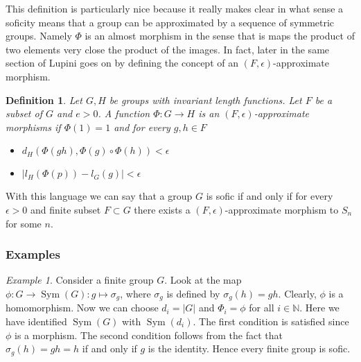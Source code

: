 \documentclass[titlepage, a4paper]{article}
\newcommand{\N}{\mathbb{N}}
\newcommand{\card}[1]{\left| #1 \right|}
\DeclareMathOperator{\sym}{Sym}
\newtheorem{definition}[theorem]{Definition}
\theoremstyle{remark}
\newtheorem{example}[theorem]{Example}
\begin{document}
	This definition is particularly nice because it really makes clear in what sense a soficity means that a group can be approximated by a sequence of symmetric groups. 
	Namely $\Phi$ is an almost morphism in the sense that is maps the product of two elements very close the product of the images. In fact, later in the same section of \cite{capraro_lupini_2015} Lupini goes on by defining the concept of an $(F, \epsilon)$-approximate morphism. 
	\begin{definition}
		Let $G, H$ be groups with invariant length functions. 
		Let $F$ be a subset of $G$ and  $e > 0$.  
		A function $\Phi:  G \to H$ is an $(F,\epsilon)$-approximate morphisms if $\Phi(1) = 1$ and for every $g, h \in F$ 
		\begin{itemize}
			\item $d_H(\Phi(gh),\Phi(g)\circ \Phi(h)) < \epsilon$
			\item $\card{l_H(\Phi(p)) - l_G(g)} < \epsilon$
		\end{itemize}
	\end{definition}
	With this language we can say that a group $G$ is sofic if and only if for every $\epsilon >0$ and finite subset $F \subset G$ there exists a $(F,\epsilon)$-approximate morphism to $S_n$ for some  $n$.


	\subsubsection{Examples}
    \begin{example}\label{ex:finite_group_sofic}
    Consider a finite group $G$. Look at the map $\phi: G \to \sym(G): g \mapsto \sigma_g$, where $\sigma_g$ is defined by $\sigma_g(h) = gh$. Clearly, $\phi$ is a homomorphism. Now we can choose $d_i = \card G$ and $\Phi_i = \phi$ for all $i \in \N$. Here we have identified $\sym(G)$ with $\sym(d_i)$. The first condition is satisfied since $\phi$ is a morphism. The second condition follows from the fact that $\sigma_g(h) = gh = h$ if and only if $g$ is the identity.
     Hence every finite group is sofic.
    \end{example}

\end{document}
